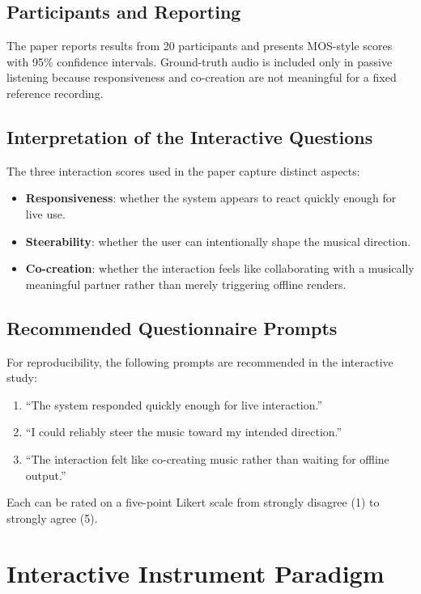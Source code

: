 \documentclass[11pt]{article}
\begin{document}
\subsection{Participants and Reporting}

The paper reports results from 20 participants and presents MOS-style scores with 95\% confidence intervals. Ground-truth audio is included only in passive listening because responsiveness and co-creation are not meaningful for a fixed reference recording.

\subsection{Interpretation of the Interactive Questions}

The three interaction scores used in the paper capture distinct aspects:
\begin{itemize}
    \item \textbf{Responsiveness}: whether the system appears to react quickly enough for live use.
    \item \textbf{Steerability}: whether the user can intentionally shape the musical direction.
    \item \textbf{Co-creation}: whether the interaction feels like collaborating with a musically meaningful partner rather than merely triggering offline renders.
\end{itemize}

\subsection{Recommended Questionnaire Prompts}

For reproducibility, the following prompts are recommended in the interactive study:
\begin{enumerate}
    \item ``The system responded quickly enough for live interaction.''
    \item ``I could reliably steer the music toward my intended direction.''
    \item ``The interaction felt like co-creating music rather than waiting for offline output.''
\end{enumerate}
Each can be rated on a five-point Likert scale from strongly disagree (1) to strongly agree (5).

\section{Interactive Instrument Paradigm}
\end{document}
